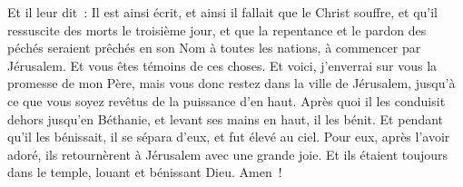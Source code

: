 \begin{multicols}{2}
Et il leur dit~: Il est ainsi écrit, et ainsi il fallait que le Christ souffre, et qu'il ressuscite des morts le troisième jour,
et que la repentance et le pardon des péchés seraient prêchés en son Nom à toutes les nations, à commencer par Jérusalem.
Et vous êtes témoins de ces choses. 
Et voici, j'enverrai sur vous la promesse de mon Père, mais vous donc restez dans la ville de Jérusalem, jusqu'à ce que vous soyez revêtus de la puissance d'en haut.
Après quoi il les conduisit dehors jusqu'en Béthanie, et levant ses mains en haut, il les bénit.
Et pendant qu'il les bénissait, il se sépara d'eux, et fut élevé au ciel.
Pour eux, après l'avoir adoré, ils retournèrent à Jérusalem avec une grande joie.
Et ils étaient toujours dans le temple, louant et bénissant Dieu. Amen~!
\PPE{}
\end{multicols}
